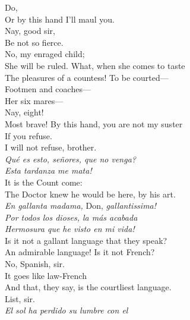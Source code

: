 \documentclass[a4paper,oneside,12pt]{memoir}
\begin{document}
\begin{drama*}
\kastrilspeaks {} Do,\\
Or by this hand I'll maul you.\\
\facespeaks {} Nay, good sir,\\
Be not so fierce.\\
\subtlespeaks {} No, my enraged child;\\
She will be ruled. What, when she comes to taste\\
The pleasures of a countess! To be courted---\\
\facespeaks Footmen and coaches---\\
\subtlespeaks {} Her six mares---\\
\facespeaks {} Nay, eight!\\
\kastrilspeaks Most brave! By this hand, you are not my suster\\
If you refuse.\\
\pliantspeaks {} I will not refuse, brother.\\
\surlyspeaks \emph{Qu\'{e} es esto, se\~{n}ores, que no venga?\\
Esta tardanza me mata!}\\
\facespeaks {} It is the Count come:\\
The Doctor knew he would be here, by his art.\\
\subtlespeaks \emph{En gallanta madama,} Don, \emph{gallantissima!}\\
\surlyspeaks \emph{Por todos los dioses, la m\'{a}s acabada\\
Hermosura que he visto en mi vida!}\\
\facespeaks Is it not a gallant language that they speak?\\
\kastrilspeaks An admirable language! Is it not French?\\
\facespeaks No, Spanish, sir.\\
\kastrilspeaks {} It goes like law-French\\
And that, they say, is the courtliest language.\\
\facespeaks {} List, sir.\\
\surlyspeaks \emph{El sol ha perdido su lumbre con el\\
}
\end{drama*}
\end{document}
